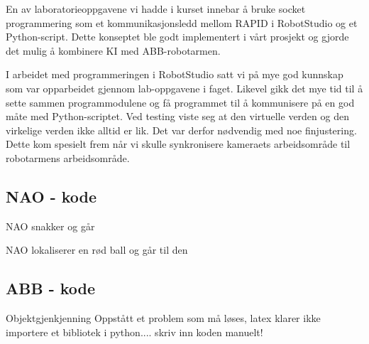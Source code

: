 \documentclass[conference]{IEEEtran}
\begin{document}
    En av laboratorieoppgavene vi hadde i kurset innebar å bruke socket programmering som et kommunikasjonsledd mellom RAPID i RobotStudio og et 
    Python-script. Dette konseptet ble godt implementert i vårt prosjekt og gjorde det mulig å kombinere KI med ABB-robotarmen. 

    I arbeidet med programmeringen i RobotStudio satt vi på mye god kunnskap som var opparbeidet gjennom lab-oppgavene i faget. Likevel gikk det 
    mye tid til å sette sammen programmodulene og få programmet til å kommunisere på en god måte med Python-scriptet. Ved testing viste seg at den 
    virtuelle verden og den virkelige verden ikke alltid er lik. Det var derfor nødvendig med noe finjustering. Dette kom spesielt frem når vi 
    skulle synkronisere kameraets arbeidsområde til robotarmens arbeidsområde. 

\appendix

\subsection{NAO - kode}
NAO snakker og går

NAO lokaliserer en rød ball og går til den


\subsection{ABB - kode}
Objektgjenkjenning
Oppstått et problem som må løses, latex klarer ikke importere et bibliotek i python.... skriv inn koden manuelt!
%
%






%
%
%




\end{document}
